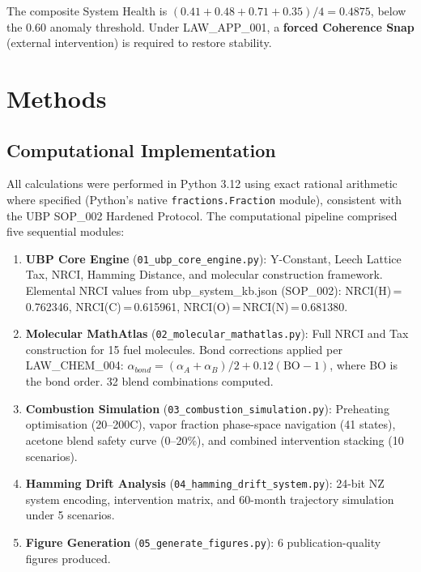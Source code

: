 \documentclass[12pt,a4paper]{article}
\begin{document}
The composite System Health is $(0.41 + 0.48 + 0.71 + 0.35)/4 = 0.4875$, below the
0.60 anomaly threshold. Under LAW\_APP\_001, a \textbf{forced Coherence Snap} (external
intervention) is required to restore stability.

\newpage

\section{Methods}

\subsection{Computational Implementation}

All calculations were performed in Python 3.12 using exact rational arithmetic where
specified (Python's native \texttt{fractions.Fraction} module), consistent with the UBP
SOP\_002 Hardened Protocol. The computational pipeline comprised five sequential
modules:
\begin{enumerate}
  \item \textbf{UBP Core Engine} (\texttt{01\_ubp\_core\_engine.py}): Y-Constant,
  Leech Lattice Tax, NRCI, Hamming Distance, and molecular construction framework.
  Elemental NRCI values from ubp\_system\_kb.json (SOP\_002):
  NRCI(H)\,=\,0.762346, NRCI(C)\,=\,0.615961, NRCI(O)\,=\,NRCI(N)\,=\,0.681380.

  \item \textbf{Molecular MathAtlas} (\texttt{02\_molecular\_mathatlas.py}): Full
  NRCI and Tax construction for 15 fuel molecules. Bond corrections applied per
  LAW\_CHEM\_004: $\alpha_{bond} = (\alpha_A + \alpha_B)/2 + 0.12(\text{BO}-1)$,
  where BO is the bond order. 32 blend combinations computed.

  \item \textbf{Combustion Simulation} (\texttt{03\_combustion\_simulation.py}):
  Preheating optimisation (20--200\textdegree C), vapor fraction phase-space
  navigation (41 states), acetone blend safety curve (0--20\%), and combined
  intervention stacking (10 scenarios).

  \item \textbf{Hamming Drift Analysis} (\texttt{04\_hamming\_drift\_system.py}):
  24-bit NZ system encoding, intervention matrix, and 60-month trajectory simulation
  under 5 scenarios.

  \item \textbf{Figure Generation} (\texttt{05\_generate\_figures.py}): 6
  publication-quality figures produced.
\end{enumerate}
\end{document}
